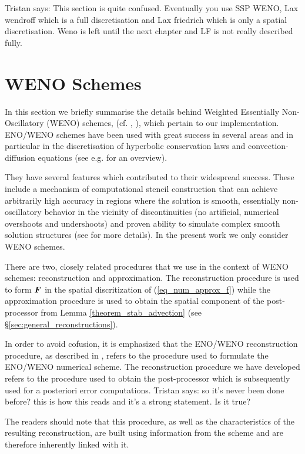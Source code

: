 \documentclass[final]{amsart}
\renewcommand{\vec}[1]{\geovec{#1}}
\newcommand{\tristan}[1]{{\color{purple} Tristan says:  #1 }}
\numberwithin{equation}{section}
\begin{document}
\tristan{This section is quite confused. Eventually you use SSP WENO, Lax wendroff which is a full discretisation and Lax friedrich which is only a spatial discretisation. Weno is left until the next chapter and LF is not really described fully.}

\section{WENO Schemes}\label{sec:ENO_WENO_schemes}

In this section we briefly summarise the details behind Weighted
Essentially Non-Oscillatory (WENO) schemes,
(cf. \cite{jiang1996efficient}, \cite{shu1998essentially}), which
pertain to our implementation.  ENO/WENO schemes have been used with
great success in several areas and in particular in the discretisation
of hyperbolic conservation laws and convection-diffusion equations
(see e.g. \cite{shu2020essentially} for an overview).

They have several features which contributed to their widespread
success.  These include a mechanism of computational stencil
construction that can achieve arbitrarily high accuracy in regions
where the solution is smooth, essentially non-oscillatory behavior in
the vicinity of discontinuities (no artificial, numerical overshoots
and undershoots) and proven ability to simulate complex smooth
solution structures (see \cite{shu1998essentially} for more details).
In the present work we only consider WENO schemes.

There are two, closely related procedures that we use in the context
of WENO schemes: reconstruction and approximation. The reconstruction
procedure is used to form $\vec{F}$ in the spatial discritization of
(\ref{eq_num_approx_f}) while the approximation procedure is used to
obtain the spatial component of the post-processor from Lemma
\ref{theorem_stab_advection} (see
\S\ref{sec:general_reconstructions}).


\begin{Rem}
  In order to avoid cofusion, it is emphasized that the ENO/WENO
  reconstruction procedure, as described in \cite{shu1998essentially},
  refers to the procedure used to formulate the ENO/WENO numerical
  scheme.  The reconstruction procedure we have developed refers to
  the procedure used to obtain the post-processor which is
  subsequently used for a posteriori error computations. \tristan{so
    it's never been done before? this is how this reads and it's a
    strong statement. Is it true?}
	
  The readers should note that this procedure, as well as the
  characteristics of the resulting reconstruction, are built using
  information from the scheme and are therefore inherently linked with
  it.
\end{Rem}
\end{document}
